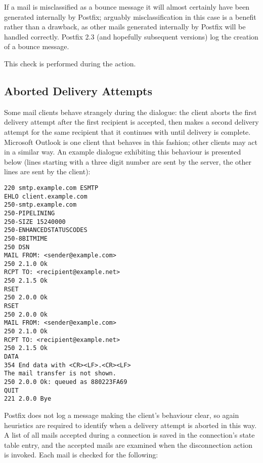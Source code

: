 If a mail is misclassified as a bounce message it will almost certainly
have been generated internally by Postfix; arguably misclassification in
this case is a benefit rather than a drawback, as other mails generated
internally by Postfix will be handled correctly.  Postfix 2.3 (and
hopefully subsequent versions) log the creation of a bounce message.

This check is performed during the  action.

\subsection{Aborted Delivery Attempts}

\label{aborted delivery attempts}

Some mail clients behave strangely during the  dialogue: the
client aborts the first delivery attempt after the first recipient is
accepted, then makes a second delivery attempt for the same recipient that
it continues with until delivery is complete.  Microsoft Outlook is one
client that behaves in this fashion; other clients may act in a similar
way.  An example dialogue exhibiting this behaviour is presented below
(lines starting with a three digit number are sent by the server, the other
lines are sent by the client):

\begin{verbatim}
220 smtp.example.com ESMTP
EHLO client.example.com
250-smtp.example.com
250-PIPELINING
250-SIZE 15240000
250-ENHANCEDSTATUSCODES
250-8BITMIME
250 DSN
MAIL FROM: <sender@example.com>
250 2.1.0 Ok
RCPT TO: <recipient@example.net>
250 2.1.5 Ok
RSET
250 2.0.0 Ok
RSET
250 2.0.0 Ok
MAIL FROM: <sender@example.com>
250 2.1.0 Ok
RCPT TO: <recipient@example.net>
250 2.1.5 Ok
DATA
354 End data with <CR><LF>.<CR><LF>
The mail transfer is not shown.
250 2.0.0 Ok: queued as 880223FA69
QUIT
221 2.0.0 Bye
\end{verbatim}

Postfix does not log a message making the client's behaviour clear, so
again heuristics are required to identify when a delivery attempt is
aborted in this way.  A list of all mails accepted during a connection is
saved in the connection's state table entry, and the accepted mails are
examined when the disconnection action is invoked.  Each mail is checked
for the following:

